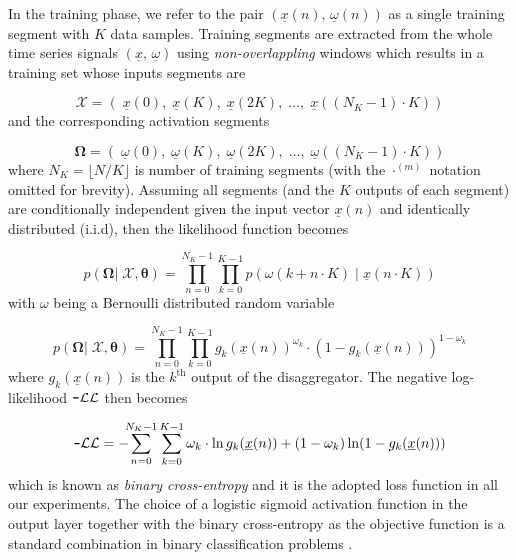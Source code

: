 \documentclass[twocolumn,letter,10pt]{IEEEtran} %
\begin{document}
In the training phase, we refer to the pair $\left(\underline{x}(n),\,\underline{\omega}(n)\right)$ as a single training segment with $K$ data samples. Training segments are extracted from the whole time series signals $\left(\underline{x},\,\underline{\omega}\right)$ using \emph{non-overlappling} windows which results in a training set whose inputs segments are

{\small\begin{equation}
	\bm{\mathcal{X}} =\left(\; \underline{x}(0),\; \underline{x}(K),\; \underline{x}(2K),\; \dots,\;\underline{x}((N_K-1)\cdot K)\right)
	\label{eq:condition-prob}
	\end{equation}}%
and the corresponding activation segments

{\small\begin{equation}
	\bm{\Omega} = \left(\; \underline{\omega}(0),\; \underline{\omega}(K),\; \underline{\omega}(2K),\; \dots,\; \underline{\omega}((N_K-1)\cdot K)\right)
	\end{equation}}%
where $N_K = \lfloor N / K\rfloor$ is number of training segments (with the $\cdot^{(m)}$ notation omitted for brevity). Assuming all segments (and the $K$ outputs of each segment) are conditionally independent given the input vector $\underline{x}(n)$ and identically distributed (i.i.d), then the likelihood function becomes


{\small\begin{equation*}
	p\left(\bm{\Omega} |\; \bm{\mathcal{X}}, \bm{\theta} \right) = \prod_{n=0}^{N_K-1} \prod_{k=0}^{K-1} p\left(\omega(k + n\cdot K) \;|\; \underline{x}(n\cdot K)\right)
	\end{equation*}}%
with $\omega$ being a Bernoulli distributed random variable

{\small\begin{equation*}
	p\left(\bm{\Omega} |\; \bm{\mathcal{X}}, \bm{\theta} \right) = \prod_{n=0}^{N_K-1} \prod_{k=0}^{K-1} g_k(\underline{x}(n))^{\omega_k} \cdot (1 - g_k(\underline{x}(n)))^{1-\omega_k}
	\end{equation*}}%
where $g_k(\underline{x}(n))$ is the $k^\text{th}$ output of the disaggregator. The negative log-likelihood $\texttt{\textbf{-}}\mathcal{LL}$ then becomes

{\small\begin{equation*}
	\small
	\texttt{\textbf{-}}\mathcal{LL} = -\kern-0.5em\sum_{n=0}^{N_K-1} \sum_{k=0}^{K-1} \omega_k\cdot\ln g_k(\underline{x}(n)) + (1-\omega_k) \ln (1 - g_k(\underline{x}(n)))
	\end{equation*}}%
which is known as \emph{binary cross-entropy} and it is the adopted loss function in all our experiments. The choice of a logistic sigmoid activation function in the output layer together with the binary cross-entropy as the objective function is a standard combination in binary classification problems \cite{Bishop_2006}.
\end{document}
